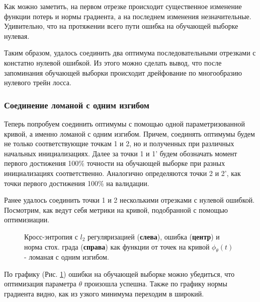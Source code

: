 \documentclass{article} %
\begin{document}
Как можно заметить, на первом отрезке происходит существенное изменение функции потерь и нормы градиента, а на последнем изменения незначительные. Удивительно, что на протяжении всего пути ошибка на обучающей выборке нулевая. 

Таким образом, удалось соединить два оптимума последовательными отрезками с констатно нулевой ошибкой. Из этого можно сделать вывод, что после запоминания обучающей выборки происходит дрейфование по многообразию нулевого трейн лосса.
\subsubsection{Соединение ломаной с одним изгибом}
Теперь попробуем соединить оптимумы с помощью одной параметризованной кривой, а именно ломаной с одним изгибом. Причем, соединять оптимумы будем не только соответствующие точкам 1 и 2, но и полученных при различных начальных инициализациях. Далее за точки 1 и 1' будем обозначать момент первого достижения 100\% точности на обучающей выборке при разных инициализациях соответственно. Аналогично определяются точки 2 и 2', как точки первого достижения 100\% на валидации.

Ранее удалось соединить точки 1 и 2 несколькими отрезками с нулевой ошибкой. Посмотрим, как ведут себя метрики на кривой, подобранной с помощью оптимизиации.
\begin{figure}[!ht]
    \centering
    \caption{Кросс-энтропия с $l_2$ регуляризацией (\textbf{слева}), ошибка (\textbf{центр}) и норма стох. града (\textbf{справа}) как функции от точек на кривой $\phi_{\theta}(t)$ - ломаная с одним изгибом.}
    \label{fig:pol_chain12}
\end{figure}
По графику (Рис. \ref{fig:pol_chain12}) ошибки на обучающей выборке можно убедиться, что оптимизация параметра $\theta$ произошла успешна. Также по графику нормы градиента видно, как из узкого минимума переходим в широкий. 
\end{document}
